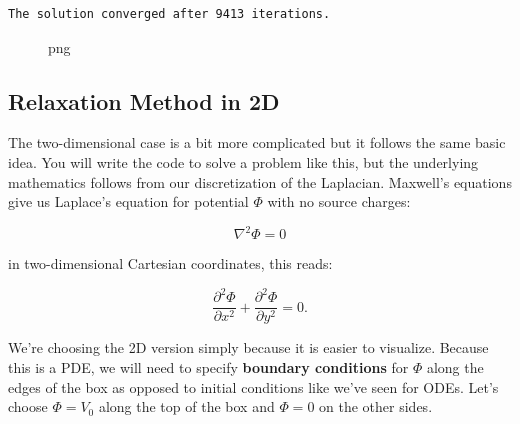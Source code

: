 \begin{verbatim}
The solution converged after 9413 iterations.
\end{verbatim}

\begin{figure}
\centering
{}
\caption{png}
\end{figure}

\subsection{Relaxation Method in 2D}\label{relaxation-method-in-2d}

The two-dimensional case is a bit more complicated but it follows the
same basic idea. You will write the code to solve a problem like this,
but the underlying mathematics follows from our discretization of the
Laplacian. Maxwell's equations give us Laplace's equation for potential
\(\Phi\) with no source charges:

\[\nabla^2 \Phi = 0 \]

in two-dimensional Cartesian coordinates, this reads:

\[
\frac{\partial^2 \Phi}{\partial x^2} + \frac{\partial^2 \Phi}{\partial y^2} = 0.
\]

We're choosing the 2D version simply because it is easier to visualize.
Because this is a PDE, we will need to specify \textbf{boundary
conditions} for \(\Phi\) along the edges of the box as opposed to
initial conditions like we've seen for ODEs. Let's choose \(\Phi = V_0\)
along the top of the box and \(\Phi = 0\) on the other sides.

